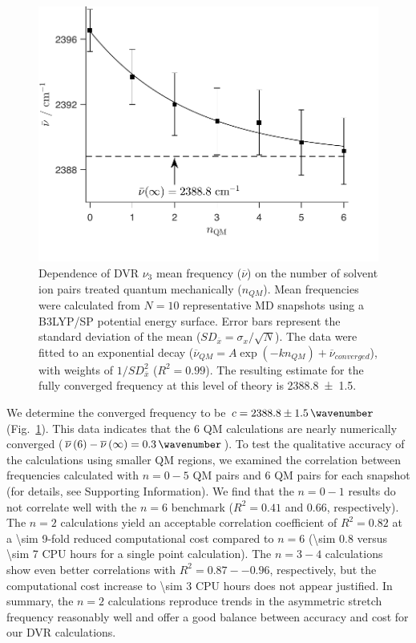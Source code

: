 \documentclass[%
  class = book,%
  crop = false,%
  float = true,%
  multi = true,%
  preview = false,%
]{standalone}
\begin{document}
\begin{figure}
  \centering
  \includegraphics{Fig5.pdf}
  \caption[DVR convergence with respect to number of QM ion pairs]{Dependence of DVR \(\nu_{3}\) mean frequency (\(\overline{\nu}\)) on the number of solvent ion pairs treated quantum mechanically (\(n_{QM}\)). Mean frequencies were calculated from \(N = 10\) representative MD snapshots using a B3LYP/SP potential energy surface. Error bars represent the standard deviation of the mean (\(SD_{\overline{x}} = \sigma_{x}/\sqrt{N}\)). The data were fitted to an exponential decay (\({\overline{\nu}}_{QM} = A\exp\left( - kn_{QM} \right) + {\overline{\nu}}_{converged}\)), with weights of \(1/SD_{\overline{x}}^{2}\) (\(R^2 = 0.99\)). The resulting estimate for the fully converged frequency at this level of theory is \SI{2388.8 \pm 1.5}{\wavenumber}.}
  \label{paper_02:fig:5}
\end{figure}

We determine the converged frequency to be \(c = \SI{2388.8 \pm 1.5}{\wavenumber}\) (Fig.~\ref{paper_02:fig:5}). This data indicates that the \num{6} QM calculations are nearly numerically converged (\(\overline{\nu}\left( 6 \right) - \overline{\nu}\left( \infty \right) = \SI{0.3}{\wavenumber}\)). To test the qualitative accuracy of the calculations using smaller QM regions, we examined the correlation between frequencies calculated with \(n = 0-5\) QM pairs and \num{6} QM pairs for each snapshot (for details, see Supporting Information). We find that the \(n = 0-1\) results do not correlate well with the \(n = 6\) benchmark (\(R^{2} = 0.41\) and \num{0.66}, respectively). The \(n = 2\) calculations yield an acceptable correlation coefficient of \(R^2 = 0.82\) at a \num{\sim 9}-fold reduced computational cost compared to \(n = 6\) (\num{\sim 0.8} versus \num{\sim 7} CPU hours for a single point calculation). The \(n = 3-4\) calculations show even better correlations with \(R^2 = 0.87 -- 0.96\), respectively, but the computational cost increase to \num{\sim 3} CPU hours does not appear justified. In summary, the \(n = 2\) calculations reproduce trends in the  asymmetric stretch frequency reasonably well and offer a good balance between accuracy and cost for our DVR calculations.
\end{document}
